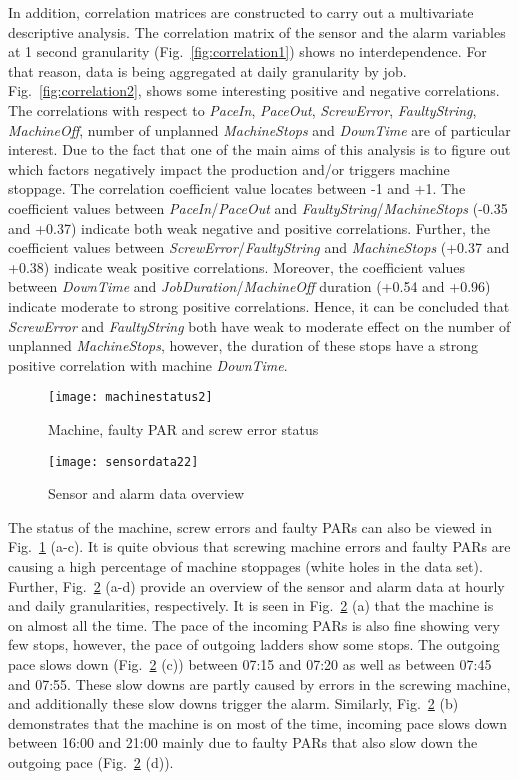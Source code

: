 \documentclass[runningheads]{llncs}
\begin{document}
In addition, correlation matrices are constructed to carry out a multivariate descriptive analysis. The correlation matrix of the sensor and the alarm variables at 1 second granularity (Fig.~\ref{fig:correlation1}) shows no interdependence. For that reason, data is being aggregated at daily granularity by job. Fig.~\ref{fig:correlation2}, shows some interesting positive and negative correlations. The correlations with respect to \emph{PaceIn}, \emph{PaceOut}, \emph{ScrewError}, \emph{FaultyString}, \emph{MachineOff}, number of unplanned \emph{MachineStops} and \emph{DownTime} are of particular interest. Due to the fact that one of the main aims of this analysis is to figure out which factors negatively impact the production and/or triggers machine stoppage. The correlation coefficient value locates between -1 and +1. The coefficient values between \emph{PaceIn}/\emph{PaceOut} and \emph{FaultyString}/\emph{MachineStops} (-0.35 and +0.37) indicate both weak negative and positive correlations. Further, the coefficient values between \emph{ScrewError}/\emph{FaultyString} and \emph{MachineStops} (+0.37 and +0.38) indicate weak positive correlations.  Moreover, the coefficient values  between \emph{DownTime} and \emph{JobDuration}/\emph{MachineOff} duration (+0.54 and +0.96) indicate moderate to strong positive correlations. Hence, it can be concluded that \emph{ScrewError} and \emph{FaultyString} both have weak to moderate effect on the number of unplanned \emph{MachineStops}, however, the duration of these stops have a strong positive correlation with machine \emph{DownTime}. 

\begin{figure}
\centering
\texttt{[image: machinestatus2]} 
\caption{Machine, faulty PAR and screw error status}
\label{fig:status}
\end{figure}


 \begin{figure}
\centering
\texttt{[image: sensordata22]} 
\caption{Sensor and alarm data overview \cite{nadeem}}
\label{fig:sensordataoverview}
\end{figure}

The status of the machine, screw errors and faulty PARs can also be viewed in Fig.~\ref{fig:status} (a-c). It is quite obvious that screwing machine errors and faulty PARs are causing a high percentage of machine stoppages (white holes in the data set). Further, Fig.~\ref{fig:sensordataoverview} (a-d) provide an overview of the sensor and alarm data at hourly and daily granularities, respectively. It is seen in Fig.~\ref{fig:sensordataoverview} (a) that the machine is on almost all the time. The pace of the incoming PARs is also fine showing very few stops, however, the pace of outgoing ladders show some stops. The outgoing pace slows down (Fig.~\ref{fig:sensordataoverview} (c)) between 07:15 and 07:20 as well as between 07:45 and 07:55. These slow downs are partly caused by errors in the screwing machine, and additionally these slow downs trigger the alarm. Similarly,  Fig.~\ref{fig:sensordataoverview} (b) demonstrates that the machine is on most of the time, incoming pace slows down between 16:00 and 21:00 mainly due to faulty PARs that also slow down the outgoing pace (Fig.~\ref{fig:sensordataoverview} (d)).
\end{document}
